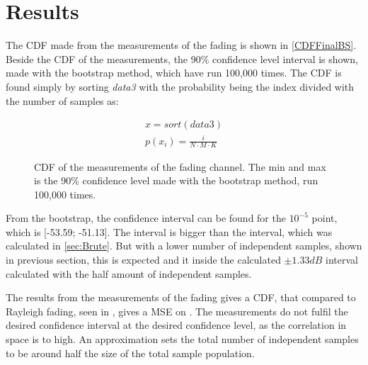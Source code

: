 \section{Results}

The CDF made from the measurements of the fading is shown in \autoref{CDFFinalBS}. Beside the CDF of the measurements, the 90\% confidence level interval is shown, made with the bootstrap method, which have run 100,000 times. The CDF is found simply by sorting \textit{data3} with the probability being the index divided with the number of samples as:

\begin{align}
x = sort(data3)\\
p(x_i) = \frac{i}{N\cdot M\cdot K} 
\end{align} 
\begin{where}
\end{where}

\begin{figure}[H]

\caption{CDF of the measurements of the fading channel. The min and max is the 90\% confidence level made with the bootstrap method, run 100,000 times.}
\label{CDFFinalBS}
\end{figure}

From the bootstrap, the confidence interval can be found for the $10^{-5}$ point, which is [-53.59; -51.13]. The interval is bigger than the interval, which was calculated in \autoref{sec:Brute}. But with a lower number of independent samples, shown in previous section, this is expected and it inside the calculated $\pm 1.33dB$ interval calculated with the half amount of independent samples.


The results from the measurements of the fading gives a CDF, that compared to Rayleigh fading, seen in , gives a MSE on . The measurements do not fulfil the desired confidence interval at the desired confidence level, as the correlation in space is to high. An approximation sets the total number of independent samples to be around half the size of the total sample population.







